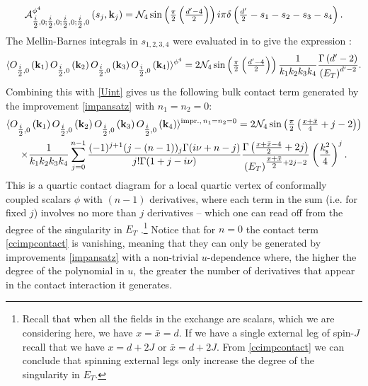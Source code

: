 \documentclass[11pt,a4paper]{article}
\begin{document}
\begin{equation}
  {\cal A}^{\phi^4}_{\tfrac{i}{2},0;\tfrac{i}{2},0;\tfrac{i}{2},0;\tfrac{i}{2},0}\left(s_j,{\bf k}_j\right) = {\cal N}_4\sin \left(\tfrac{\pi}{2}  \left(\tfrac{d^\prime-4}{2}\right)\right) i\pi \delta\left(\tfrac{d^\prime}{2}-s_1-s_2-s_3-s_4\right).
\end{equation}
The Mellin-Barnes integrals in $s_{1,2,3,4}$ were evaluated in \cite{Sleight:2019mgd} to give the expression \cite{Arkani-Hamed:2015bza}:
\begin{multline}\label{ccphi4}
     \langle O_{\tfrac{i}{2},0}\left({\bf k}_1\right)O_{\tfrac{i}{2},0}\left({\bf k}_2\right)O_{\tfrac{i}{2},0}\left({\bf k}_3\right) O_{\tfrac{i}{2},0}\left({\bf k}_4\right) \rangle^{\phi^4}=2{\cal N}_4\sin \left(\tfrac{\pi}{2}  \left(\tfrac{d^\prime-4}{2}\right)\right)\frac{1}{k_1k_2k_3k_4}\frac{\Gamma\left(d^\prime-2\right)}{\left(E_T\right)^{d^\prime-2}}.
\end{multline}
Combining this with \eqref{Uint} gives us the following bulk contact term generated by the improvement \eqref{impansatz} with $n_1=n_2=0$:
\begin{multline}\label{ccimpcontact}
    \langle O_{\tfrac{i}{2},0}\left({\bf k}_1\right)O_{\tfrac{i}{2},0}\left({\bf k}_2\right)O_{\tfrac{i}{2},0}\left({\bf k}_3\right) O_{\tfrac{i}{2},0}\left({\bf k}_4\right) \rangle^{\text{impr.},\,n_1=n_2=0}=2{\cal N}_4\sin \left(\tfrac{\pi}{2}  \left(\tfrac{x+{\bar x}}{4}+j-2\right)\right) \\ \times \frac{1}{k_1k_2k_3k_4}\sum_{j=0}^{n-1}\frac{(-1)^{j+1}  (j-(n-1))_j \Gamma (i\nu+n-j )}{j! \Gamma (1+j-i \nu )}\frac{\Gamma\left(\tfrac{x+{\bar x}-4}{2}+2j\right)}{\left(E_T\right)^{\tfrac{x+{\bar x}}{2}+2j-2}}\left(\frac{k^2_{\sf s}}{4}\right)^j.
\end{multline}
This is a quartic contact diagram for a local quartic vertex of conformally coupled scalars $\phi$ with $\left(n-1\right)$ derivatives, where each term in the sum (i.e. for fixed $j$) involves no more than $j$ derivatives -- which one can read off from the degree of the singularity in $E_T$ \cite{Arkani-Hamed:2018kmz}.\footnote{Recall that when all the fields in the exchange are scalars, which we are considering here, we have $x={\bar x}=d$. If we have a single external leg of spin-$J$ recall that we have $x=d+2J$ or ${\bar x}=d+2J$. From \eqref{ccimpcontact} we can conclude that spinning external legs only increase the degree of the singularity in $E_T$.} Notice that for $n=0$ the contact term \eqref{ccimpcontact} is vanishing, meaning that they can only be generated by improvements \eqref{impansatz} with a non-trivial $u$-dependence where, the higher the degree of the polynomial in $u$, the greater the number of derivatives that appear in the contact interaction it generates. 
\end{document}
